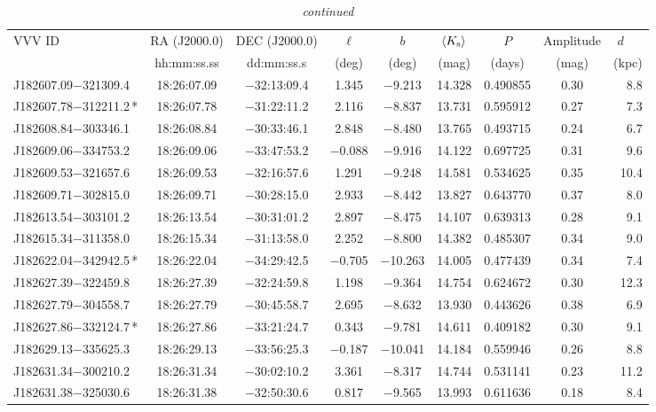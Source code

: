 \begin{table*}
\centering
\caption[]{{\it continued}}
\begin{tabular}{lcccccccr}
\hline \hline
VVV ID & RA (J2000.0)  & DEC (J2000.0) & $\ell$ & $b$ &  $\langle K_{\rm s} \rangle$ & $P$ & Amplitude & $d$~~~ \\
     & hh:mm:ss.ss    & dd:mm:ss.s   &  (deg) & (deg) &   (mag)       & (days) & (mag) & (kpc)   \\
\hline
J182607.09$-$321309.4 & 18:26:07.09 & $-$32:13:09.4 &  1.345 & $-$9.213 & 14.328 & 0.490855 & 0.30 & 8.8 \\
J182607.78$-$312211.2\,* & 18:26:07.78 & $-$31:22:11.2 &  2.116 & $-$8.837 & 13.731 & 0.595912 & 0.27 & 7.3 \\
J182608.84$-$303346.1 & 18:26:08.84 & $-$30:33:46.1 &  2.848 & $-$8.480 & 13.765 & 0.493715 & 0.24 & 6.7 \\
J182609.06$-$334753.2 & 18:26:09.06 & $-$33:47:53.2 & $-$0.088 & $-$9.916 & 14.122 & 0.697725 & 0.31 & 9.6 \\
J182609.53$-$321657.6 & 18:26:09.53 & $-$32:16:57.6 &  1.291 & $-$9.248 & 14.581 & 0.534625 & 0.35 & 10.4 \\
J182609.71$-$302815.0 & 18:26:09.71 & $-$30:28:15.0 &  2.933 & $-$8.442 & 13.827 & 0.643770 & 0.37 & 8.0 \\
J182613.54$-$303101.2 & 18:26:13.54 & $-$30:31:01.2 &  2.897 & $-$8.475 & 14.107 & 0.639313 & 0.28 & 9.1 \\
J182615.34$-$311358.0 & 18:26:15.34 & $-$31:13:58.0 &  2.252 & $-$8.800 & 14.382 & 0.485307 & 0.34 & 9.0 \\
J182622.04$-$342942.5\,* & 18:26:22.04 & $-$34:29:42.5 & $-$0.705 & $-$10.263 & 14.005 & 0.477439 & 0.34 & 7.4 \\
J182627.39$-$322459.8 & 18:26:27.39 & $-$32:24:59.8 &  1.198 & $-$9.364 & 14.754 & 0.624672 & 0.30 & 12.3 \\
J182627.79$-$304558.7 & 18:26:27.79 & $-$30:45:58.7 &  2.695 & $-$8.632 & 13.930 & 0.443626 & 0.38 & 6.9 \\
J182627.86$-$332124.7\,* & 18:26:27.86 & $-$33:21:24.7 &  0.343 & $-$9.781 & 14.611 & 0.409182 & 0.30 & 9.1 \\
J182629.13$-$335625.3 & 18:26:29.13 & $-$33:56:25.3 & $-$0.187 & $-$10.041 & 14.184 & 0.559946 & 0.26 & 8.8 \\
J182631.34$-$300210.2 & 18:26:31.34 & $-$30:02:10.2 &  3.361 & $-$8.317 & 14.744 & 0.531141 & 0.23 & 11.2 \\
J182631.38$-$325030.6 & 18:26:31.38 & $-$32:50:30.6 &  0.817 & $-$9.565 & 13.993 & 0.611636 & 0.18 & 8.4 \\

\end{tabular}
\end{table*}
